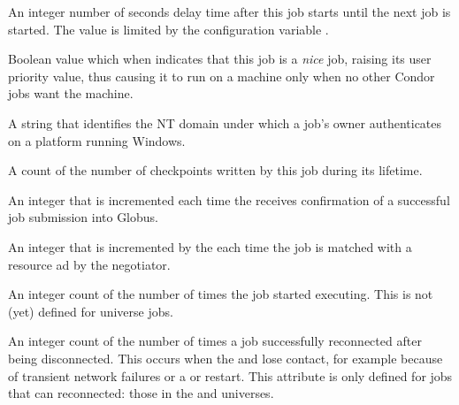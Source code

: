 \begin{description}
\item[\AdAttr{NextJobStartDelay}:]  An integer number of seconds delay time
after this job starts until the next job is started. The value is limited
by the configuration variable .

\item[\AdAttr{NiceUser}:]  Boolean value which when  indicates
that this job is a \emph{nice} job, raising its user priority value, 
thus causing it to run on a machine only when no other Condor jobs want 
the machine.

\item[\AdAttr{NTDomain}:]  A string that identifies the NT domain under
which a job's owner authenticates on a platform running Windows.

\item[\AdAttr{NumCkpts}:]  A count of the number of checkpoints
written by this job during its lifetime.

\item[\AdAttr{NumGlobusSubmits}:]   An integer that is incremented each
time the  receives confirmation of a successful job
submission into Globus.

\item[\AdAttr{NumJobMatches}:]  An integer that is incremented by the
 each time the job is matched with a resource ad by the
negotiator.

\item[\AdAttr{NumJobStarts}:]  An integer count of the number of times the
  job started executing.
  This is not (yet) defined for  universe jobs.

\item[\AdAttr{NumJobReconnects}:]  An integer count of the number of times a
  job successfully reconnected after being disconnected.
  This occurs when the
   and  lose contact,
  for example because of
  transient network failures or a  or 
  restart.
  This attribute is only defined for jobs that can reconnected:
  those in the  and  universes.


\end{description}
